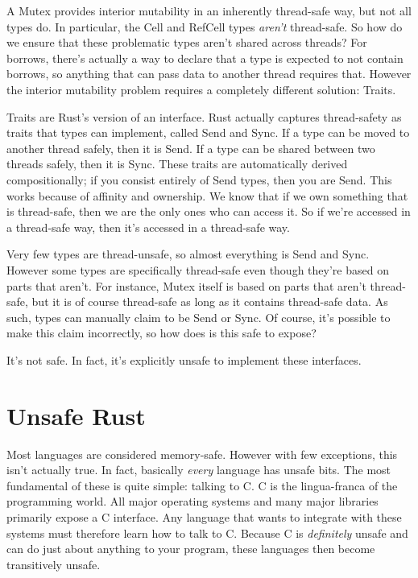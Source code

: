 A Mutex provides interior mutability in an inherently thread-safe way, but not
all types do. In particular, the Cell and RefCell types \emph{aren't} thread-safe.
So how do we ensure that these problematic types aren't shared across threads?
For borrows, there's actually a way to declare that a type is expected to not
contain borrows, so anything that can pass data to another thread requires that.
However the interior mutability problem requires a completely different solution:
Traits.

Traits are Rust's version of an interface. Rust actually captures thread-safety
as traits that types can implement, called Send and Sync. If a type can be moved
to another thread safely, then it is Send. If a type can be shared between two
threads safely, then it is Sync. These traits are automatically derived
compositionally; if you consist entirely of Send types, then you are Send. This
works because of affinity and ownership. We know that if we own something
that is thread-safe, then we are the only ones who can access it. So if we're
accessed in a thread-safe way, then it's accessed in a thread-safe way.

Very few types are thread-unsafe, so almost everything is Send and Sync. However
some types are specifically thread-safe even though they're based on parts that
aren't. For instance, Mutex itself is based on parts that aren't thread-safe, but
it is of course thread-safe as long as it contains thread-safe data. As such,
types can manually claim to be Send or Sync. Of course, it's possible to
make this claim incorrectly, so how does is this safe to expose?

It's not safe. In fact, it's explicitly unsafe to implement these interfaces.



\section{Unsafe Rust}

Most languages are considered memory-safe. However with few exceptions, this
isn't actually true. In fact, basically \emph{every} language has unsafe bits.
The most fundamental of these is quite
simple: talking to C. C is the lingua-franca of the programming world. All
major operating systems and many major libraries primarily expose a C interface.
Any language that wants to integrate with these systems must therefore learn
how to talk to C. Because C is \emph{definitely} unsafe and can do just about anything
to your program, these languages then become transitively unsafe.

